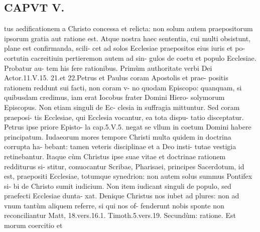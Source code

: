 \documentclass{article}
\begin{document}
\begin{pages}
\section*{CAPVT V. }
\marginpar{[ p.245 ]}\pstart tus aedificationem a Christo concessa et relicta: non solum autem praepositorum ipsorum gratia aut ratione est. Atque nostra haec sententia, cui multi obsistunt, plane est confirmanda, scili- cet ad solos Ecclesiae praepositos eius iuris et po- cortutin cacreitiuin pertieremon autem ad sin- gulos de coetu et populo Ecclesiae. Probatur au- tem his fere rationibus.  \pend\pstart Primùm authoritate verbi Dei Actor.11.V.15. 21.et 22.Petrus et Paulus coram Apostolis et prae- positis rationem reddunt sui facti, non coram v- no quodam Episcopo: quanquam, si quibusdam credimus, iam erat Iocobus frater Domini Hiero- solymorum Episcopus. Non etiam singuli de Ec- clesia in suffragia mittuntur. Sed coram praeposi- tis Ecclesiae, qui Ecclesia vocantur, ea tota dispu- tatio disceptatur. Petrus ipse priore Episto- la cap.5.V.5. negat se vllum in coetum Domini habere principatum. Iudaeorum mores tempore Christi multa quidem in doctrina corrupta ha- bebant: tamen veteris disciplinae et a Deo insti- tutae vestigia retinebantur. Itaque cùm Christus ipse suae vitae et doctrinae rationem redditurus si- stitur, conuocantur Scribae, Pharisaei, principes Sacerdotum, id est, praepositi Ecclesiae, totumque synedrion: non autem solus summus Pontifex si- bi de Christo sumit iudicium. Non item iudicant singuli de populo, sed praefecti Ecclesiae dunta- xat. Denique Christus nos iubet ad plures: non ad vnum tantùm aliquem referre, si qui nos of- fenderunt nobis sponte non reconciliantur Matt, 18.vers.16.1. Timoth.5.vers.19.  \pend\pstart Secundùm: ratione. Est morum coercitio et  \pend

\end{pages}
\end{document}
